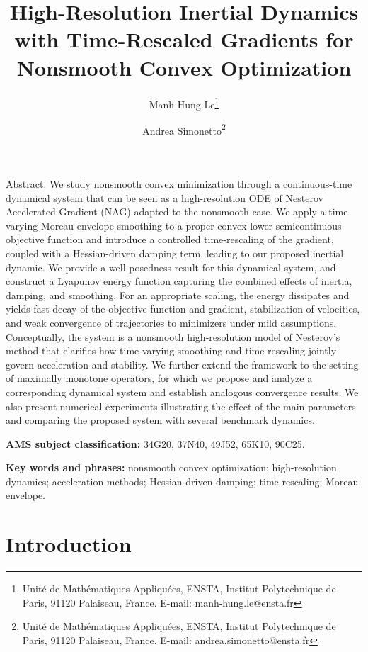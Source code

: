 \documentclass[11pt]{article}
\title{High-Resolution Inertial Dynamics with Time-Rescaled Gradients for Nonsmooth Convex Optimization}
\numberwithin{equation}{section}
\begin{document}
\date{}
\author{Manh Hung Le\thanks{Unité de Mathématiques Appliquées, ENSTA, Institut Polytechnique de Paris, 91120 Palaiseau, France. E-mail: manh-hung.le@ensta.fr}
	\and
	Andrea Simonetto\thanks{Unité de Mathématiques Appliquées, ENSTA, Institut Polytechnique de Paris, 91120 Palaiseau, France. E-mail: andrea.simonetto@ensta.fr}
}
\maketitle
 {\sc Abstract.} We study nonsmooth convex minimization through a continuous-time dynamical system that can be seen as a high-resolution ODE of Nesterov Accelerated Gradient (NAG) adapted to the nonsmooth case. We apply a time-varying Moreau envelope smoothing to a proper convex lower semicontinuous objective function and introduce a controlled time-rescaling of the gradient, coupled with a Hessian-driven damping term, leading to our proposed inertial dynamic. We provide a well-posedness result for this dynamical system, and construct a Lyapunov energy function capturing the combined effects of inertia, damping, and smoothing. For an appropriate scaling, the energy dissipates and yields fast decay of the objective function and gradient, stabilization of velocities, and weak convergence of trajectories to minimizers under mild assumptions. Conceptually, the system is a nonsmooth high-resolution model of Nesterov's method that clarifies how time-varying smoothing and time rescaling jointly govern acceleration and stability. We further extend the framework to the setting of maximally monotone operators, for which we propose and analyze a corresponding dynamical system and establish analogous convergence results.  We also present numerical experiments illustrating the effect of the main parameters and comparing the proposed system with several benchmark dynamics.

 
 

  

\bigskip

\noindent \textbf{AMS subject classification:} 34G20, 37N40, 49J52, 65K10, 90C25.

\bigskip


\noindent  \textbf{Key words and phrases:} nonsmooth convex optimization; high-resolution dynamics; acceleration methods; Hessian-driven damping; time rescaling; Moreau envelope.

 
 
\section{Introduction}
\end{document}
